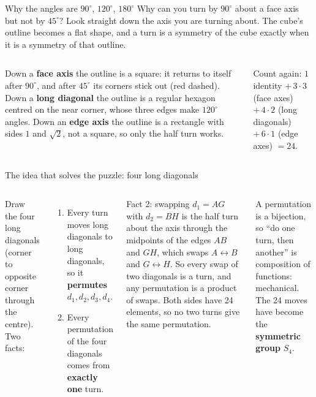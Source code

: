 \documentclass[aspectratio=169,10pt]{beamer}
\begin{document}
\begin{frame}{Why the angles are $90^\circ$, $120^\circ$, $180^\circ$}
Why can you turn by $90^\circ$ about a face axis but not by $45^\circ$? Look straight down the axis you are turning about. The cube's outline becomes a flat shape, and a turn is a symmetry of the cube exactly when it is a symmetry of that outline.
\begin{center}\scalebox{0.78}{\figwhypi}\end{center}
\begin{columns}[T]
\footnotesize Down a \textbf{face axis} the outline is a square: it returns to itself after $90^\circ$, and after $45^\circ$ its corners stick out (red dashed). Down a \textbf{long diagonal} the outline is a regular hexagon centred on the near corner, whose three edges make $120^\circ$ angles. Down an \textbf{edge axis} the outline is a rectangle with sides $1$ and $\sqrt2$, not a square, so only the half turn works.
\begin{whybox}
Count again: $1$ identity $+\,3\cdot3$ (face axes) $+\,4\cdot2$ (long diagonals) $+\,6\cdot1$ (edge axes) $=24$.
\end{whybox}
\end{columns}
\end{frame}

\begin{frame}{The idea that solves the puzzle: four long diagonals}
\begin{columns}[T]
\centering{}
Draw the four long diagonals (corner to opposite corner through the centre). Two facts:
\begin{enumerate}
\item Every turn moves long diagonals to long diagonals, so it \textbf{permutes} $d_1,d_2,d_3,d_4$.
\item Every permutation of the four diagonals comes from \textbf{exactly one} turn.
\end{enumerate}
\begin{whybox}
Fact 2: swapping $d_1=AG$ with $d_2=BH$ is the half turn about the axis through the midpoints of the edges $AB$ and $GH$, which swaps $A\leftrightarrow B$ and $G\leftrightarrow H$. So every swap of two diagonals is a turn, and any permutation is a product of swaps. Both sides have 24 elements, so no two turns give the same permutation.
\end{whybox}
\begin{bigbox}
A permutation is a bijection, so ``do one turn, then another'' is composition of functions: mechanical. The 24 moves have become the \textbf{symmetric group} $S_4$.
\end{bigbox}
\end{columns}
\end{frame}
\end{document}

